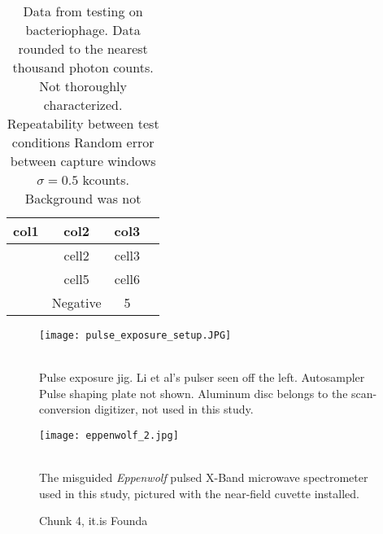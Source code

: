 \documentclass[fleqn,10pt]{article}
\begin{document}



\begin{table}[h!]
	\centering
	\begin{tabular}{ |c|c|c|c| } 
		\hline
		col1 & col2 & col3 \\
		\hline
		& cell2 & cell3 \\ 
		& cell5 & cell6 \\ 
		& Negative & 5 \\ 
		\hline
	\end{tabular}

	\caption{Data from testing on bacteriophage. Data rounded to the nearest thousand photon counts. Not thoroughly characterized. Repeatability between test conditions  Random error between capture windows $\sigma=0.5$ kcounts. Background was not  }
\end{table}


\begin{figure}[H]
	\captionsetup{singlelinecheck = false, justification=justified}
	\centering
	\texttt{[image: pulse\_exposure\_setup.JPG]}
	\caption{\\ Pulse exposure jig. Li et al's pulser seen off the left. Autosampler Pulse shaping plate not shown. Aluminum disc belongs to the scan-conversion digitizer, not used in this study.}
\end{figure}
	
\begin{figure}[H]
	\captionsetup{singlelinecheck = false, justification=justified}
	\centering
	\texttt{[image: eppenwolf\_2.jpg]}
	\caption{\\ The misguided {\it Eppenwolf} pulsed X-Band microwave spectrometer used in this study, pictured with the near-field cuvette installed.}
\end{figure}

\clearpage















\begin{figure}[H]
	\caption{Chunk 4, it.is Founda}
\end{figure}


\clearpage
\end{document}
